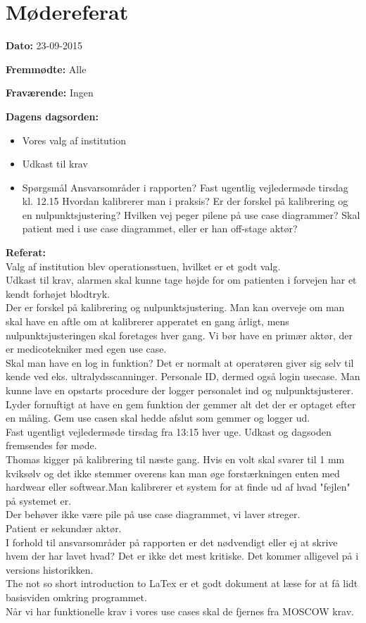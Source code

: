 \chapter{Mødereferat}

\textbf{Dato:} 23-09-2015

\textbf{Fremmødte:} Alle

\textbf{Fraværende:} Ingen

\textbf{Dagens dagsorden:}
\begin{itemize}
	\item Vores valg af institution
	\item Udkast til krav
	\item Spørgsmål
	\SubItem Ansvarsområder i rapporten?
	\SubItem Fast ugentlig vejledermøde tirsdag kl. 12.15
	\SubItem Hvordan kalibrerer man i praksis?
	\SubItem Er der forskel på kalibrering og en nulpunktsjustering?
	\SubItem Hvilken vej peger pilene på use case diagrammer?
	\SubItem Skal patient med i use case diagrammet, eller er han off-stage aktør?
\end{itemize}

\textbf{Referat:}
\\Valg af institution blev operationsstuen, hvilket er et godt valg. 
\\Udkast til krav, alarmen skal kunne tage højde for om patienten i forvejen har et kendt forhøjet blodtryk.
\\Der er forskel på kalibrering og nulpunktsjustering. Man kan overveje om man skal have en aftle om at kalibrerer apperatet en gang årligt, mens nulpunktsjusteringen skal foretages hver gang. Vi bør have en primær aktør, der er medicotekniker med egen use case. 
\\Skal man have en log in funktion? Det er normalt at operatøren giver sig selv til kende ved eks. ultralydsscanninger. Personale ID, dermed også login usecase. Man kunne lave en opstarts procedure der logger personalet ind og nulpunktsjusterer.
\\Lyder fornuftigt at have en gem funktion der gemmer alt det der er optaget efter en måling. Gem use casen skal hedde afslut som gemmer og logger ud.
\\Fast ugentligt vejledermøde tirsdag fra 13:15 hver uge. Udkast og dagsoden fremsendes før møde.
\\Thomas kigger på kalibrering til næste gang. Hvis en volt skal svarer til 1 mm kviksølv og det ikke stemmer overens kan man øge forstærkningen enten med hardwear eller softwear.Man kalibrerer et system for at finde ud af hvad "fejlen" på systemet er.
\\Der behøver ikke være pile på use case diagrammet, vi laver streger.
\\Patient er sekundær aktør.
\\I forhold til ansvarsområder på rapporten er det nødvendigt eller ej at skrive hvem der har lavet hvad? Det er ikke det mest kritiske. Det kommer alligevel på i versions historikken.
\\The not so short introduction to LaTex er et godt dokument at læse for at få lidt basisviden omkring programmet.
\\Når vi har funktionelle krav i vores use cases skal de fjernes fra MOSCOW krav.